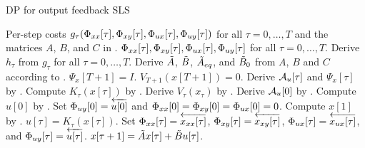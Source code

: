 \begin{algorithm}
\caption{DP for output feedback SLS}\label{alg:plainSLS}
\begin{algorithmic}[1]
    \REQUIRE Per-step costs $g_{\tau}(\Phi_{xx}[\tau],\Phi_{xy}[\tau],\Phi_{ux}[\tau],\Phi_{uy}[\tau])$ for all $\tau = 0, \dots, T$ and the matrices $A$, $B$, and $C$ in .
    \ENSURE $\Phi_{xx}[\tau],\Phi_{xy}[\tau],\Phi_{ux}[\tau],\Phi_{uy}[\tau]$ for all $\tau = 0, \dots, T$.
    \STATE Derive $h_\tau$ from $g_{\tau}$ for all $\tau = 0, \dots, T$.\label{plainSLS-setup0}
    \STATE Derive $\tilde{A}$, $\tilde{B}$, $\tilde{A}_{eq}$, and $\tilde{B}_0$ from $A$, $B$ and $C$ according to .
    \STATE $\Psi_x[T+1] = I$.
    \STATE $V_{T+1}(x[T+1]) = 0$.\label{plainSLS-setup1}
        \STATE Derive $\mathcal{A}_u[\tau]$ and $\Psi_x[\tau]$ by .\label{plainSLS-compute0}
        \STATE Compute $K_{\tau}(x[\tau])$ by .
        \STATE Derive $V_{\tau}(x_{\tau})$ by .\label{plainSLS-compute1}
    \ENDFOR
    \STATE Derive $\mathcal{A}_u[0]$ by .\label{plainSLS-final0}
    \STATE Compute $u[0]$ by .
	\STATE Set $\Phi_{uy}[0] = \overleftarrow{u[0]}$ and $\Phi_{xx}[0] = \Phi_{xy}[0] = \Phi_{ux}[0] = 0$.
    \STATE Compute $x[1]$ by .    
    \label{plainSLS-final0.0}
        \STATE $u[\tau] = K_{\tau}(x[\tau]).$
        \STATE Set $\Phi_{xx}[\tau] = \overleftarrow{x_{xx}[\tau]}$, $\Phi_{xy}[\tau] = \overleftarrow{x_{xy}[\tau]}$, $\Phi_{ux}[\tau] = \overleftarrow{x_{ux}[\tau]}$, and $\Phi_{uy}[\tau] = \overleftarrow{u[\tau]}$.
		\STATE $x[\tau+1] = \tilde{A} x[\tau] + \tilde{B} u[\tau]$.        
    \ENDFOR\label{plainSLS-final1}
\end{algorithmic}
\end{algorithm}


